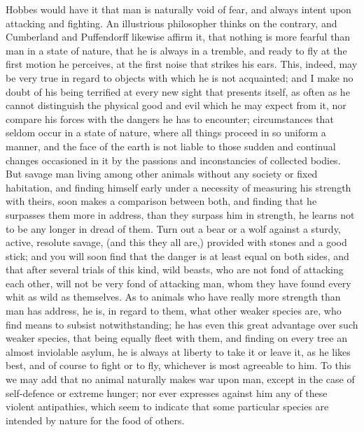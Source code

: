 \documentclass[11pt,twocolumn]{ltugboat}
\begin{document}
Hobbes would have it that man is naturally void of fear, and always
intent upon attacking and fighting. An illustrious philosopher thinks
on the contrary, and Cumberland and Puffendorff likewise affirm it,
that nothing is more fearful than man in a state of nature, that he is
always in a tremble, and ready to fly at the first motion he
perceives, at the first noise that strikes his ears. This, indeed, may
be very true in regard to objects with which he is not acquainted; and
I make no doubt of his being terrified at every new sight that
presents itself, as often as he cannot distinguish the physical good
and evil which he may expect from it, nor compare his forces with the
dangers he has to encounter; circumstances that seldom occur in a
state of nature, where all things proceed in so uniform a manner, and
the face of the earth is not liable to those sudden and continual
changes occasioned in it by the passions and inconstancies of
collected bodies. But savage man living among other animals without
any society or fixed habitation, and finding himself early under a
necessity of measuring his strength with theirs, soon makes a
comparison between both, and finding that he surpasses them more in
address, than they surpass him in strength, he learns not to be any
longer in dread of them. Turn out a bear or a wolf against a sturdy,
active, resolute savage, (and this they all are,) provided with stones
and a good stick; and you will soon find that the danger is at least
equal on both sides, and that after several trials of this kind, wild
beasts, who are not fond of attacking each other, will not be very
fond of attacking man, whom they have found every whit as wild as
themselves. As to animals who have really more strength than man has
address, he is, in regard to them, what other weaker species are, who
find means to subsist notwithstanding; he has even this great
advantage over such weaker species, that being equally fleet with
them, and finding on every tree an almost inviolable asylum, he is
always at liberty to take it or leave it, as he likes best, and of
course to fight or to fly, whichever is most agreeable to him. To this
we may add that no animal naturally makes war upon man, except in the
case of self-defence or extreme hunger; nor ever expresses against him
any of these violent antipathies, which seem to indicate that some
particular species are intended by nature for the food of others.
\end{document}
